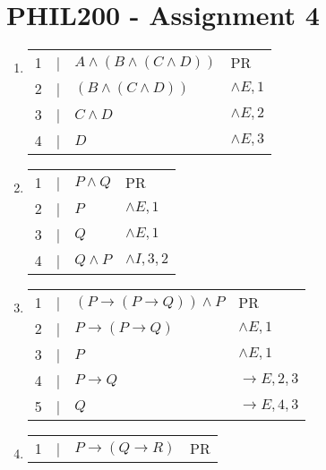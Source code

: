 \documentclass{article}
\begin{document}
\section*{PHIL200 - Assignment 4}

\begin{enumerate}
    \item \begin{tabular}{llp{5cm}l}
              \hline
              1 & | & \underline{$A \land (B \land (C \land D))$} & PR           \\
              2 & | & $(B \land (C \land D))$                     & $\land E, 1$ \\
              3 & | & $C \land D$                                 & $\land E, 2$ \\
              4 & | & $D$                                         & $\land E, 3$ \\
              \hline
          \end{tabular}
    \item \begin{tabular}{llp{5cm}l}
              1 & | & \underline{$P \land Q$} & PR              \\
              2 & | & $P$                     & $\land E, 1$    \\
              3 & | & $Q$                     & $\land E, 1$    \\
              4 & | & $Q \land P$             & $\land I, 3, 2$ \\
              \hline
          \end{tabular}
    \item \begin{tabular}{llp{5cm}l}
              1 & | & \underline{$(P \to (P \to Q)) \land P$} & PR            \\
              2 & | & $P \to (P \to Q)$                       & $\land E, 1$  \\
              3 & | & $P$                                     & $\land E, 1$  \\
              4 & | & $P \to Q$                               & $\to E, 2, 3$ \\
              5 & | & $Q$                                     & $\to E, 4, 3$ \\
              \hline
          \end{tabular}
    \item \begin{tabular}{llp{5cm}l}
              1 & | & \underline{$P \to (Q \to R)$}  & PR            \\

\end{tabular}
\end{enumerate}
\end{document}
